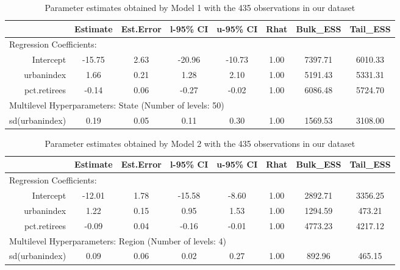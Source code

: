 \documentclass[12pt]{article}
\begin{document}
\begin{table}[ht]
	\centering
	 \begin{adjustbox}{max width=\textwidth}
	\begin{tabular}{rccccccc}
		\hline
		& Estimate & Est.Error & l-95\% CI & u-95\% CI & Rhat & Bulk\_ESS & Tail\_ESS \\ 
		\hline
		\multicolumn{8}{l}{Regression Coefficients:} \\
		Intercept & -15.75 & 2.63 & -20.96 & -10.73 & 1.00 & 7397.71 & 6010.33 \\ 
		urbanindex & 1.66 & 0.21 & 1.28 & 2.10 & 1.00 & 5191.43 & 5331.31 \\ 
		pct.retirees & -0.14 & 0.06 & -0.27 & -0.02 & 1.00 & 6086.48 & 5724.70 \\
		\midrule
		\multicolumn{8}{l}{Multilevel Hyperparameters: State (Number of levels: 50)}                       \\ 
		sd(urbanindex) & 0.19 & 0.05 & 0.11 & 0.30 & 1.00 & 1569.53 & 3108.00 \\ 
		\hline
	\end{tabular}
		\end{adjustbox}
	\caption{Parameter estimates obtained by Model 1 with the 435 observations in our dataset}
	\label{tab:model1}
\end{table}


\begin{table}[h]
	\centering
		 \begin{adjustbox}{max width=\textwidth}
	\begin{tabular}{rccccccc}
		\hline
		               & Estimate & Est.Error & l-95\% CI & u-95\% CI & Rhat & Bulk\_ESS & Tail\_ESS \\
		               \hline
 \multicolumn{8}{l}{Regression Coefficients:} \\
		     Intercept &   -12.01 &      1.78 &    -15.58 &     -8.60 & 1.00 &   2892.71 &   3356.25 \\
		    urbanindex &     1.22 &      0.15 &      0.95 &      1.53 & 1.00 &   1294.59 &    473.21 \\
		  pct.retirees &    -0.09 &      0.04 &     -0.16 &     -0.01 & 1.00 &   4773.23 &   4217.12 \\
		  \midrule
		  \multicolumn{8}{l}{Multilevel Hyperparameters: Region (Number of levels: 4)}                       \\
		sd(urbanindex) &     0.09 &      0.06 &      0.02 &      0.27 & 1.00 &    892.96 &    465.15 \\ \hline
	\end{tabular}
	\end{adjustbox}
	\caption{Parameter estimates obtained by Model 2 with the 435 observations in our dataset}
	\label{tab:model2}
\end{table}
\end{document}
